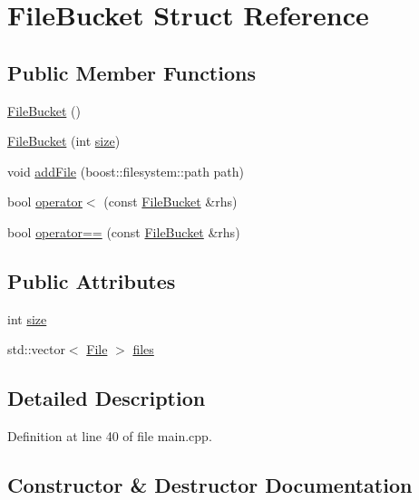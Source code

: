 \hypertarget{struct_file_bucket}{}\section{File\+Bucket Struct Reference}
\label{struct_file_bucket}
\subsection*{Public Member Functions}
\begin{DoxyCompactItemize}
\item 
\hyperlink{struct_file_bucket_afc1e5378909a2241237c113c5d83e410}{File\+Bucket} ()
\item 
\hyperlink{struct_file_bucket_aa6b5213e228054000ef4373407e39e58}{File\+Bucket} (int \hyperlink{struct_file_bucket_a16f787c14b9b69c959374749f70bb80a}{size})
\item 
void \hyperlink{struct_file_bucket_a44e2797122359f1b1f7cb67a0f02e2ce}{add\+File} (boost\+::filesystem\+::path path)
\item 
bool \hyperlink{struct_file_bucket_a97ba88a917daa112da2fcd008082a0f4}{operator$<$} (const \hyperlink{struct_file_bucket}{File\+Bucket} \&rhs)
\item 
bool \hyperlink{struct_file_bucket_ac5f5769f6643b0f078a49c80f48233ff}{operator==} (const \hyperlink{struct_file_bucket}{File\+Bucket} \&rhs)
\end{DoxyCompactItemize}
\subsection*{Public Attributes}
\begin{DoxyCompactItemize}
\item 
int \hyperlink{struct_file_bucket_a16f787c14b9b69c959374749f70bb80a}{size}
\item 
std\+::vector$<$ \hyperlink{struct_file}{File} $>$ \hyperlink{struct_file_bucket_a4da87f8307c3d3b6b477b6277897d5b9}{files}
\end{DoxyCompactItemize}


\subsection{Detailed Description}


Definition at line 40 of file main.\+cpp.



\subsection{Constructor \& Destructor Documentation}
\hypertarget{struct_file_bucket_afc1e5378909a2241237c113c5d83e410}{}
